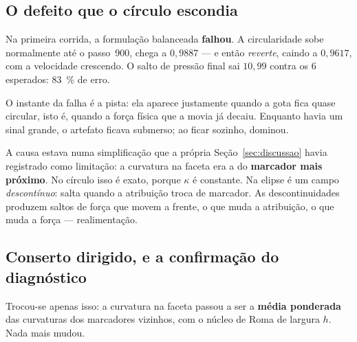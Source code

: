 \subsection{O defeito que o c\'irculo escondia}

Na primeira corrida, a formula\c{c}\~ao balanceada \textbf{falhou}. A
circularidade sobe normalmente at\'e o passo~900, chega a $0{,}9887$ --- e ent\~ao
\emph{reverte}, caindo a $0{,}9617$, com a velocidade crescendo. O salto de
press\~ao final sai $10{,}99$ contra os $6$ esperados: \SI{83}{\percent} de erro.

\begin{center}
\end{center}

O instante da falha \'e a pista: ela aparece justamente quando a gota fica quase
circular, isto \'e, quando a for\c{c}a f\'isica que a movia j\'a decaiu. Enquanto
havia um sinal grande, o artefato ficava submerso; ao ficar sozinho, dominou.

A causa estava numa simplifica\c{c}\~ao que a pr\'opria
Se\c{c}\~ao~\ref{sec:discussao} havia registrado como limita\c{c}\~ao: a
curvatura na faceta era a do \textbf{marcador mais pr\'oximo}. No c\'irculo isso
\'e exato, porque $\kappa$ \'e constante. Na elipse \'e um campo
\emph{descont\'inuo}: salta quando a atribui\c{c}\~ao troca de marcador. As
descontinuidades produzem saltos de for\c{c}a que movem a frente, o que muda a
atribui\c{c}\~ao, o que muda a for\c{c}a --- realimenta\c{c}\~ao.

\subsection{Conserto dirigido, e a confirma\c{c}\~ao do diagn\'ostico}

Trocou-se apenas isso: a curvatura na faceta passou a ser a \textbf{m\'edia
ponderada} das curvaturas dos marcadores vizinhos, com o n\'ucleo de Roma de
largura $h$. Nada mais mudou.

